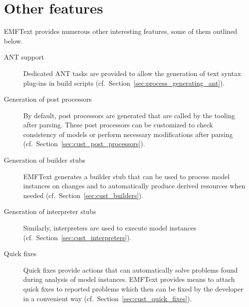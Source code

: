 \section{Other features}

EMFText provides numerous other interesting features, some of them outlined below.

\begin{description}

  \item[ANT support]
        Dedicated ANT tasks are provided to allow the generation of text syntax 
        plug-ins in build scripts (cf.~Section~\ref{sec:process_generating_ant}).
        
  \item[Generation of post processors]
        By default, post processors are generated that are called by the 
        tooling after parsing. These post processors can be customized to
        check consistency of models or perform necessary modifications after
        parsing (cf.~Section~\ref{sec:cust_post_processors}).

  \item[Generation of builder stubs]
        EMFText generates a builder stub that can be used to process 
        model instances on changes and to automatically produce derived 
        resources when needed (cf.~Section~\ref{sec:cust_builders}).
        
  \item[Generation of interpreter stubs]
        Similarly, interpreters are used to execute model instances 
        (cf.~Section~\ref{sec:cust_interpreters}).
  
  \item[Quick fixes]
        Quick fixes provide actions that can automatically solve problems found during
        analysis of model instances. EMFText provides means to attach quick fixes to
        reported problems which then can be fixed by the developer in a convenient way 
        (cf.~Section~\ref{sec:cust_quick_fixes}).
      
\end{description}